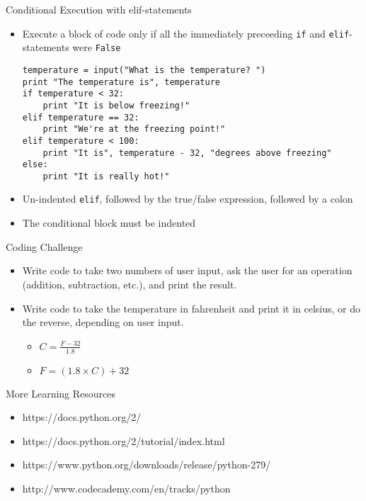 \begin{frame}[fragile]{Conditional Execution with {\ttfamily elif}-statements}
  \begin{itemize}
    \item Execute a block of code only if all the immediately preceeding \texttt{if} and \texttt{elif}-statements were \texttt{False}
\begin{lstlisting}
temperature = input("What is the temperature? ")
print "The temperature is", temperature
if temperature < 32:
    print "It is below freezing!"
elif temperature == 32:
    print "We're at the freezing point!"
elif temperature < 100:
    print "It is", temperature - 32, "degrees above freezing"
else:
    print "It is really hot!"
\end{lstlisting}
\item Un-indented \texttt{elif}, followed by the true/false expression, followed by a colon
\item The conditional block must be indented
  \end{itemize}
\end{frame}

\begin{frame}{Coding Challenge}
  \begin{itemize}
    \item Write code to take two numbers of user input, ask the user for an operation (addition, subtraction, etc.), and print the result.
    \item Write code to take the temperature in fahrenheit and print it in celsius, or do the reverse, depending on user input.
      \begin{itemize}
        \item $C = \displaystyle\frac{F - 32}{1.8}$
        \item $F = (1.8 \times C) + 32$
      \end{itemize}
  \end{itemize}
\end{frame}

\begin{frame}{More Learning Resources}
  \begin{itemize}
    \item https://docs.python.org/2/
    \item https://docs.python.org/2/tutorial/index.html
    \item https://www.python.org/downloads/release/python-279/
    \item http://www.codecademy.com/en/tracks/python
  \end{itemize}
\end{frame}



